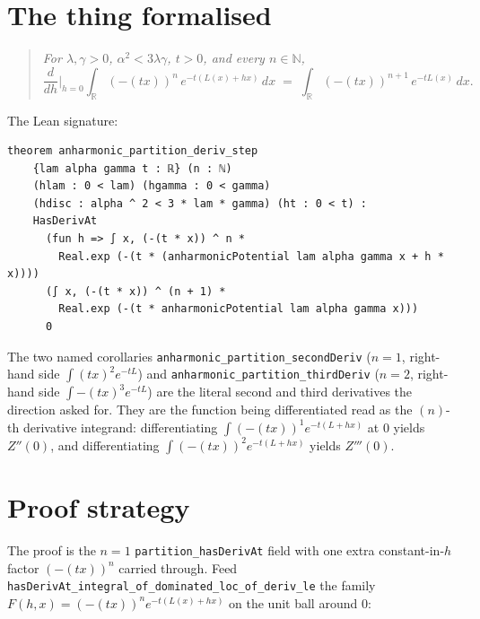 \documentclass[11pt]{article}
\begin{document}
\section{The thing formalised}

\begin{quote}\itshape
For $\lambda,\gamma>0$, $\alpha^2<3\lambda\gamma$, $t>0$, and every
$n\in\mathbb{N}$,
\[
  \frac{d}{dh}\Big|_{h=0}\!\int_{\mathbb{R}} (-(tx))^n\,
      e^{-t(L(x)+hx)}\,dx
    \;=\; \int_{\mathbb{R}} (-(tx))^{n+1}\,e^{-t L(x)}\,dx .
\]
\end{quote}

The Lean signature:

\begin{verbatim}
theorem anharmonic_partition_deriv_step
    {lam alpha gamma t : ℝ} (n : ℕ)
    (hlam : 0 < lam) (hgamma : 0 < gamma)
    (hdisc : alpha ^ 2 < 3 * lam * gamma) (ht : 0 < t) :
    HasDerivAt
      (fun h => ∫ x, (-(t * x)) ^ n *
        Real.exp (-(t * (anharmonicPotential lam alpha gamma x + h * x))))
      (∫ x, (-(t * x)) ^ (n + 1) *
        Real.exp (-(t * anharmonicPotential lam alpha gamma x)))
      0
\end{verbatim}

The two named corollaries \texttt{anharmonic\_partition\_secondDeriv}
($n=1$, right-hand side $\int (tx)^2 e^{-tL}$) and
\texttt{anharmonic\_partition\_thirdDeriv} ($n=2$, right-hand side
$\int -(tx)^3 e^{-tL}$) are the literal second and third derivatives the
direction asked for. They are the function being differentiated read as the
$(n)$-th derivative integrand: differentiating $\int(-(tx))^1 e^{-t(L+hx)}$
at $0$ yields $Z''(0)$, and differentiating $\int(-(tx))^2 e^{-t(L+hx)}$
yields $Z'''(0)$.

\section{Proof strategy}

The proof is the $n=1$ \texttt{partition\_hasDerivAt} field with one extra
constant-in-$h$ factor $(-(tx))^n$ carried through. Feed
\texttt{hasDerivAt\_integral\_of\_dominated\_loc\_of\_deriv\_le} the family
$F(h,x)=(-(tx))^n e^{-t(L(x)+hx)}$ on the unit ball around $0$:
\end{document}

